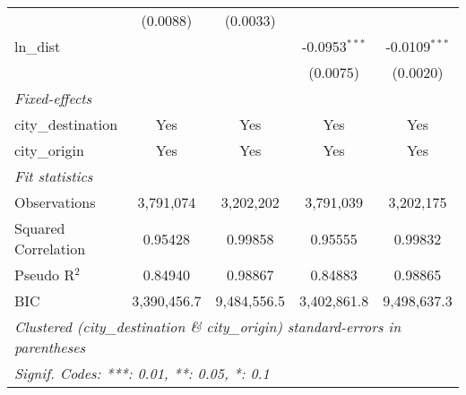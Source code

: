 \begin{tabular}{lcccc}
                                           & (0.0088)        & (0.0033)        &                 &   \\   
   ln\_dist                                &                 &                 & -0.0953$^{***}$ & -0.0109$^{***}$\\   
                                           &                 &                 & (0.0075)        & (0.0020)\\   
   \midrule
   \emph{Fixed-effects}\\
   city\_destination                       & Yes             & Yes             & Yes             & Yes\\  
   city\_origin                            & Yes             & Yes             & Yes             & Yes\\  
   \midrule
   \emph{Fit statistics}\\
   Observations                            & 3,791,074       & 3,202,202       & 3,791,039       & 3,202,175\\  
   Squared Correlation                     & 0.95428         & 0.99858         & 0.95555         & 0.99832\\  
   Pseudo R$^2$                            & 0.84940         & 0.98867         & 0.84883         & 0.98865\\  
   BIC                                     & 3,390,456.7     & 9,484,556.5     & 3,402,861.8     & 9,498,637.3\\  
   \midrule \midrule
   \multicolumn{5}{l}{\emph{Clustered (city\_destination \& city\_origin) standard-errors in parentheses}}\\
   \multicolumn{5}{l}{\emph{Signif. Codes: ***: 0.01, **: 0.05, *: 0.1}}\\
\end{tabular}
\par\endgroup




